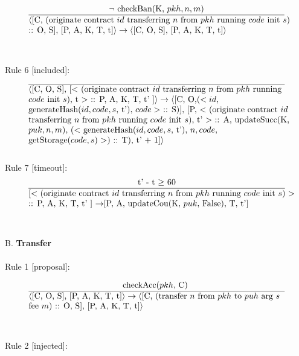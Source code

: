 \documentclass[a4paper]{llncs}
\begin{document}
\begin{equation}{}
\frac{\text{$\neg$ checkBan(K, $pkh, n, m$)}}{\parbox{4.2in}{\text{$\langle$[C, (originate contract ${id}$ transferring  ${n}$ from ${pkh}$ running ${code}$ init ${s}$)} \text{:: O, S], [P, A, K, T, t]$\rangle \rightarrow \langle$[C, O, S],} \text{[P, A, K, T, t]$\rangle$}}} 
\end{equation}
~\\
~\\
Rule 6 [included]:
\begin{equation}{}
\frac{}{\parbox{4.2in}{\text{$\langle$[C, O, S], [$<$ (originate contract ${id}$ transferring  ${n}$ from ${pkh}$ running } \\
\text{${code}$ init ${s}$), t $>$ :: P, A, K, T, t' ]$\rangle \rightarrow \langle$[C, O,($< id$, } \\
\text{generateHash($id, code, s$, t'), $code >$ :: S)], [P, $<$ (originate contract ${id}$ } \\
\text{transferring  ${n}$ from ${pkh}$ running ${code}$ init ${s}$), t' $>$ :: A, updateSucc(K, } \\
\text{$puk, n, m$), ($<$ generateHash($id, code, s$, t'), $n, code$, } \\
 \text{getStorage($code, s$) $>$) :: T), t' + 1]$\rangle$}}} 
\end{equation}
~\\
Rule 7 [timeout]:
\begin{equation}{}
\frac{\text{t' - t $\ge$ 60}}{\parbox{4.2in}{\text{[$<$ (originate contract ${id}$ transferring  ${n}$ from ${pkh}$ running ${code}$ init ${s}$) $>$ } \\
\text{:: P, A, K, T, t' ] $\rightarrow$[P, A, updateCou(K, $puk$, False), T, t']}}} 
\end{equation}
~\\
~\\
B. \textbf{Transfer}
\\
~\\
Rule 1 [proposal]:

\begin{equation}{}
\frac{\text{checkAcc($pkh$, C)  }}{\parbox{4.2in}{\text{$\langle$[C, O, S], [P, A, K, T, t]$\rangle \rightarrow \langle$[C, (transfer ${n}$ from ${pkh}$ to  ${puh}$ arg ${s}$ }  \\
\text{fee ${m}$) :: O, S], [P, A, K, T, t]$\rangle$}}} 
\end{equation}
~\\
~\\
Rule 2 [injected]:
\end{document}
